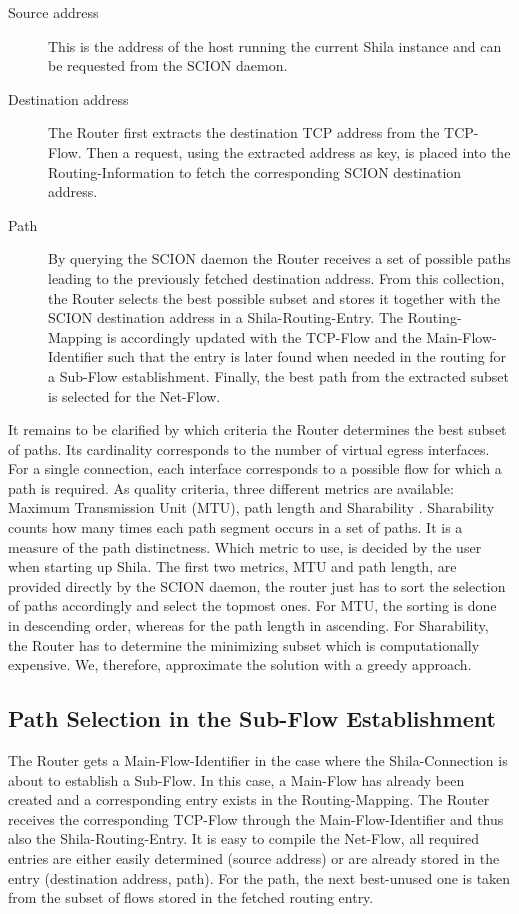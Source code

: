 \begin{description}
	\item[Source address] This is the address of the host running the current Shila instance and can be requested from the SCION daemon.
	\item[Destination address] The Router first extracts the destination TCP address from the TCP-Flow. Then a request, using the extracted address as key, is placed into the Routing-Information to fetch the corresponding SCION destination address.
	\item[Path] By querying the SCION daemon the Router receives a set of possible paths leading to the previously fetched destination address. From this collection, the Router selects the best possible subset and stores it together with the SCION destination address in a Shila-Routing-Entry. The Routing-Mapping is accordingly updated with the TCP-Flow and the Main-Flow-Identifier such that the entry is later found when needed in the routing for a Sub-Flow establishment. Finally, the best path from the extracted subset is selected for the Net-Flow.
\end{description}

It remains to be clarified by which criteria the Router determines the best subset of paths. Its cardinality corresponds to the number of virtual egress interfaces. For a single connection, each interface corresponds to a possible flow for which a path is required. As quality criteria, three different metrics are available: Maximum Transmission Unit (MTU), path length and Sharability \cite{Sharability}. Sharability counts how many times each path segment occurs in a set of paths. It is a measure of the path distinctness. Which metric to use, is decided by the user when starting up Shila. The first two metrics, MTU and path length, are provided directly by the SCION daemon, the router just has to sort the selection of paths accordingly and select the topmost ones. For MTU, the sorting is done in descending order, whereas for the path length in ascending. For Sharability, the Router has to determine the minimizing subset which is computationally expensive. We, therefore, approximate the solution with a greedy approach.

\subsection*{Path Selection in the Sub-Flow Establishment}

The Router gets a Main-Flow-Identifier in the case where the Shila-Connection is about to establish a Sub-Flow. In this case, a Main-Flow has already been created and a corresponding entry exists in the Routing-Mapping. The Router receives the corresponding TCP-Flow through the Main-Flow-Identifier and thus also the Shila-Routing-Entry. It is easy to compile the Net-Flow, all required entries are either easily determined (source address) or are already stored in the entry (destination address, path). For the path, the next best-unused one is taken from the subset of flows stored in the fetched routing entry.


